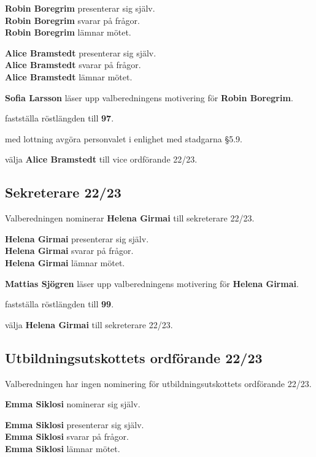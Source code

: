 \documentclass[../protokoll_vintermote_2022.tex]{subfiles}
\begin{document}
\textbf{Robin Boregrim} presenterar sig själv. \\
\textbf{Robin Boregrim} svarar på frågor. \\
\textbf{Robin Boregrim} lämnar mötet.

\textbf{Alice Bramstedt} presenterar sig själv. \\
\textbf{Alice Bramstedt} svarar på frågor. \\
\textbf{Alice Bramstedt} lämnar mötet.

\textbf{Sofia Larsson} läser upp valberedningens motivering för \textbf{Robin Boregrim}.

\motetbeslutar\att{} fastställa röstlängden till \textbf{97}.

\motetbeslutar\att{} med lottning avgöra personvalet i enlighet med stadgarna §5.9.

\motetbeslutar\att{} välja \textbf{Alice Bramstedt} till vice ordförande 22/23.





\subsection{Sekreterare 22/23}
Valberedningen nominerar \textbf{Helena Girmai} till sekreterare 22/23.

\textbf{Helena Girmai} presenterar sig själv. \\
\textbf{Helena Girmai} svarar på frågor. \\
\textbf{Helena Girmai} lämnar mötet.

\textbf{Mattias Sjögren} läser upp valberedningens motivering för \textbf{Helena Girmai}.

\motetbeslutar\att{} fastställa röstlängden till \textbf{99}.

\motetbeslutar\att{} välja \textbf{Helena Girmai} till sekreterare 22/23.





\subsection{Utbildningsutskottets ordförande 22/23}
Valberedningen har ingen nominering för utbildningsutskottets ordförande 22/23.

\textbf{Emma Siklosi} nominerar sig själv.

\textbf{Emma Siklosi} presenterar sig själv. \\
\textbf{Emma Siklosi} svarar på frågor. \\
\textbf{Emma Siklosi} lämnar mötet.
\end{document}
